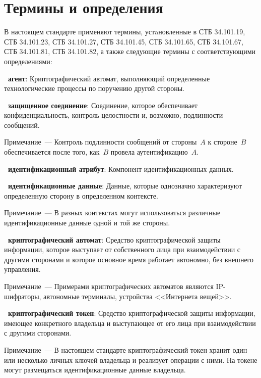 \chapter{Термины и определения}

В настоящем стандарте применяют термины, устaновленные в СТБ 34.101.19,
СТБ 34.101.23, СТБ 34.101.27, СТБ 34.101.45, СТБ 34.101.65, 
СТБ 34.101.67, СТБ 34.101.81, СТБ 34.101.82, а также следующие термины с 
соответствующими определениями:

{\bf \thedefctr~агент}:
Криптографический автомат, выполняющий определенные технологические 
процессы по поручению другой стороны.

{\bf \thedefctr~защищенное соединение}:
Соединение, которое обеспечивает конфиденциальность, 
контроль целостности и, возможно, подлинности сообщений. 

\begin{note}
Примечание~--- Контроль подлинности сообщений от стороны~$A$ к стороне~$B$ 
обеспечивается после того, как~$B$ провела аутентификацию~$A$.
\end{note}

{\bf \thedefctr~идентификационный атрибут}:
Компонент идентификационных данных. 

{\bf \thedefctr~идентификационные данные}:
Данные, которые однозначно характеризуют определенную 
сторону в определенном контексте. 

\begin{note}
Примечание~--- В разных контекстах могут использоваться 
различные идентификационные данные одной и той же стороны.
\end{note}

{\bf\thedefctr~криптографический автомат}: 
Средство криптографической защиты информации, которое выступает от 
собственного лица при взаимодействии с другими сторонами
и которое основное время работает автономно, без внешнего управления.

\begin{note}
Примечание~--- 
Примерами криптографических автоматов являются IP-шифраторы, 
автономные терминалы, устройства <<Интернета вещей>>.
\end{note}

{\bf\thedefctr~криптографический токен}: 
Средство криптографической защиты информации, имеющее конкретного 
владельца и выступающее от его лица при взаимодействии с другими 
сторонами. 
%
\begin{note}
Примечание~--- В настоящем стандарте криптографический токен хранит один 
или несколько личных ключей владельца и реализует операции с ними.  
%
На токене могут размещаться идентификационные данные владельца. 
\end{note}

